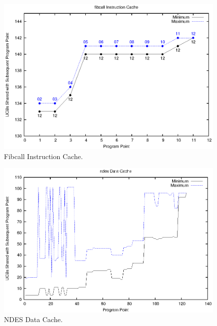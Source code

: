 \begin{figure}[h!]
\begin{center}
\includegraphics[width=\linewidth]{eps/fibcall-icache.eps}
\caption{Fibcall Instruction Cache.}
\label{fig:fibcall_instruction_cache}
\end{center}
\end{figure}
%
\vspace{-20pt}
\begin{figure}[h!]
\begin{center}
\includegraphics[width=\linewidth]{eps/ndes-dcache.eps}
\caption{NDES Data Cache.}
\label{fig:ndes_data_cache}
\end{center}
\end{figure}
%
\vspace{-20pt}
